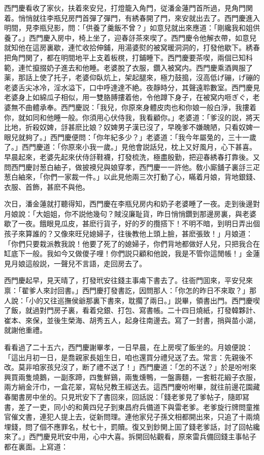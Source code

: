 西門慶看收了家伙，扶着來安兒，打燈籠入角門，従潘金蓮門首所過，見角門関着。悄悄就往李瓶兒房門首彈了彈門，有綉春開了門，來安就出去了。西門慶進入明間，見李瓶兒影，問：「供養了羹飯不曾？」如意兒就出來應道：「剛纔我和姐供養了。」西門慶入房中，椅上坐了，迎春㧱茶來喫了。西門慶令他解衣帶，如意兒就知他在這房裏歇，連忙收拾伸鋪，用湯婆熨的被窝暖洞洞的，打發他歇下。綉春把角門関了，都在明間地平上支着板櫈，打鋪睡下。西門慶要茶喫，兩個已知科範，連忙攛掇奶子進去和他睡。老婆脫了衣服，鑽入被窝内。西門慶乘酒興服了薬，那話上使了托子，老婆仰臥炕上，架起腿來，極力鼓搗，沒高低げ磞，げ磞的老婆舌尖冰冷，淫水溢下，口中呼達達不絶。夜靜時分，其聲遠聆數室。西門慶見老婆身上如綿瓜子相似，用一雙胳膊摟着他，令他蹲下身子，在被窝内咂ぎぐ，老婆無不曲體承奉。西門慶説：「我兒，你原來身體皮肉也和你娘一般白淨，我摟着你，就如同和他睡一般。你須用心伏侍我，我看顧你。」老婆道：「爹沒的説，將天比地，折殺奴婢，㧱甚麽比娘？奴婢男子漢已沒了，早晚爹不嫌醜陋，只看奴婢一眼兒就夠了。」西門慶便問：「你年紀多少？」老婆道：「我今年屬兔的，三十一歲了。」西門慶道：「你原來小我一歲。」見他會説話兒，枕上又好風月，心下甚喜。早晨起來，老婆先起來伏侍㧱鞋襪，打發梳洗，極盡殷勤，把迎春綉春打靠後。又問西門慶討葱白紬子，做披襖兒與娘穿孝，西門慶一一許他。敎小廝舖子裏㧱三疋葱白紬來，「你們一家裁一件。」以此見他兩三次打動了心，瞞着月娘，背地銀錢、衣服、首飾，甚麽不與他。

次日，潘金蓮就打聽得知，西門慶在李瓶兒房内和奶子老婆睡了一夜。走到後邊對月娘說：「大姐姐，你不説他幾句？賊沒廉耻貨，昨日悄悄鑽到那邊房裏，與老婆歇了一夜。餓眼見瓜皮，甚麽行貨子，好的歹的攬搭下！不明不暗，到明日弄出個孩子來算誰的？又像來旺兒媳婦子，往後教他上頭上臉，甚麽張致！」月娘道：「你們只要栽派教我說！他要了死了的媳婦子，你們背地都做好人兒，只把我合在缸底下一般。我如今又做儍子哩！你們説只顧和他說，我是不管你這閒帳！」金蓮見月娘這般説，一聲兒不言語，走回房去了。

西門慶起早，見天晴了，打發玳安往錢主事䖏下書去了。往衙門囬來，平安兒來禀：「翟爹人來討回書。」西門慶打發書訖，因問那人：「你怎的昨日不來取？」那人說：「小的又往巡撫侯爺那裏下書來，耽擱了兩日。」説畢，領書出門。西門慶喫了飯，就過對門房子裏，看着兌銀、打包、寫書帳。二十四日燒紙，打發韓夥計、崔本、來保，並後生榮海、胡秀五人，起身往南邊去。寫了一封書，捎與苗小湖，就謝他重禮。

看看過了二十五六，西門慶謝畢孝，一日早晨，在上房喫了飯坐的。月娘便說：「這出月初一日，是喬親家長姐生日，咱也還買分禮兒送了去。常言：先親後不改。莫非咱家孩兒沒了，断了禮不送了！」西門慶道：「怎的不送？」於是吩咐來興買兩隻燒鵝，一副豕蹄，四隻鮮鷄，兩隻燻鴨，一盤壽麵，一套粧花緞子衣服，兩方綃金汗巾，一盒花翠，寫帖兒教王經送去。這西門慶吩咐畢，就往前邊花園藏春閣書房中坐的。只見玳安下了書回來，回話説：「錢老爹見了爹帖子，隨即冩書，差了一吏，同小的和黄四兒子到東昌府兵備道下與雷老爹。老爹旋行牌問童推官催文書，連犯人提上去，従新問理。連他家兒子孫文相都開出來，只追了十兩燒埋錢，問了個不應罪名，杖七十，罰贖。復又到鈔関上囬了錢老爹話，討了回帖纔來了。」西門慶見玳安中用，心中大喜。拆開回帖觀看，原來雷兵備回錢主事帖子都在裏面。上寫道：

